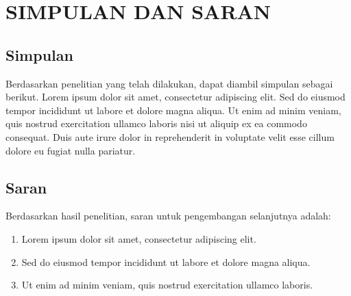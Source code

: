 \chapter{SIMPULAN DAN SARAN}

\section{Simpulan}


Berdasarkan penelitian yang telah dilakukan, dapat diambil simpulan sebagai berikut. Lorem ipsum dolor sit amet, consectetur adipiscing elit. Sed do eiusmod tempor incididunt ut labore et dolore magna aliqua. Ut enim ad minim veniam, quis nostrud exercitation ullamco laboris nisi ut aliquip ex ea commodo consequat. Duis aute irure dolor in reprehenderit in voluptate velit esse cillum dolore eu fugiat nulla pariatur.

\section{Saran}


Berdasarkan hasil penelitian, saran untuk pengembangan selanjutnya adalah:

\begin{enumerate}
    \item Lorem ipsum dolor sit amet, consectetur adipiscing elit.
    \item Sed do eiusmod tempor incididunt ut labore et dolore magna aliqua.
    \item Ut enim ad minim veniam, quis nostrud exercitation ullamco laboris.
\end{enumerate}

